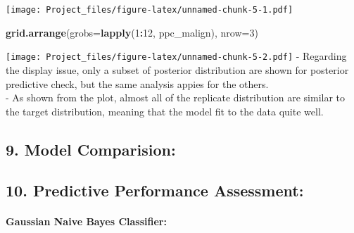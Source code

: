 \documentclass[
]{article}
\newenvironment{Shaded}{\begin{snugshade}}{\end{snugshade}}
\newcommand{\CommentTok}[1]{\textcolor[rgb]{0.56,0.35,0.01}{\textit{#1}}}
\newcommand{\DataTypeTok}[1]{\textcolor[rgb]{0.13,0.29,0.53}{#1}}
\newcommand{\DecValTok}[1]{\textcolor[rgb]{0.00,0.00,0.81}{#1}}
\newcommand{\KeywordTok}[1]{\textcolor[rgb]{0.13,0.29,0.53}{\textbf{#1}}}
\newcommand{\NormalTok}[1]{#1}
\newcommand{\OperatorTok}[1]{\textcolor[rgb]{0.81,0.36,0.00}{\textbf{#1}}}
\newcommand{\StringTok}[1]{\textcolor[rgb]{0.31,0.60,0.02}{#1}}
\begin{document}
\texttt{[image: Project\_files/figure-latex/unnamed-chunk-5-1.pdf]}

\begin{Shaded}
\begin{Highlighting}[]
\KeywordTok{grid.arrange}\NormalTok{(}\DataTypeTok{grobs=}\KeywordTok{lapply}\NormalTok{(}\DecValTok{1}\OperatorTok{:}\DecValTok{12}\NormalTok{, ppc\_malign), }\DataTypeTok{nrow=}\DecValTok{3}\NormalTok{)}
\end{Highlighting}
\end{Shaded}

\texttt{[image: Project\_files/figure-latex/unnamed-chunk-5-2.pdf]} -
Regarding the display issue, only a subset of posterior distribution are
shown for posterior predictive check, but the same analysis appies for
the others.\\
- As shown from the plot, almost all of the replicate distribution are
similar to the target distribution, meaning that the model fit to the
data quite well.

\hypertarget{model-comparision}{%
\subsection{9. Model Comparision:}\label{model-comparision}}

\hypertarget{predictive-performance-assessment}{%
\subsection{10. Predictive Performance
Assessment:}\label{predictive-performance-assessment}}

\hypertarget{gaussian-naive-bayes-classifier-5}{%
\paragraph{Gaussian Naive Bayes
Classifier:}\label{gaussian-naive-bayes-classifier-5}}

\begin{Shaded}
\end{Shaded}
\end{document}
